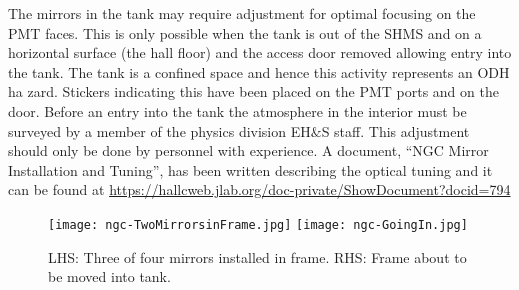 {The mirrors in the tank may require adjustment for optimal focusing on
the PMT faces. This is only possible when the tank is out of the SHMS
and on a horizontal surface (the hall floor) and the access door
removed allowing entry into the tank. The tank is a confined space and
hence this activity represents an ODH ha zard. Stickers indicating this
have been placed on the PMT ports and on the door. Before an entry
into the tank the atmosphere in the interior must be surveyed by a
member of the physics division EH$\&$S staff.  This adjustment should
only be done by personnel with experience. A document, ``NGC Mirror
Installation and Tuning'', has been written describing the optical
tuning and it can be found at
\url{https://hallcweb.jlab.org/doc-private/ShowDocument?docid=794}

\begin{figure}[!h] %
   \centering
   \texttt{[image: ngc-TwoMirrorsinFrame.jpg]}
   \texttt{[image: ngc-GoingIn.jpg]}
   \caption{LHS: Three of four mirrors installed in frame. RHS: Frame
     about to be moved into tank.\label{fig:install}}

   \end{figure}
}%
